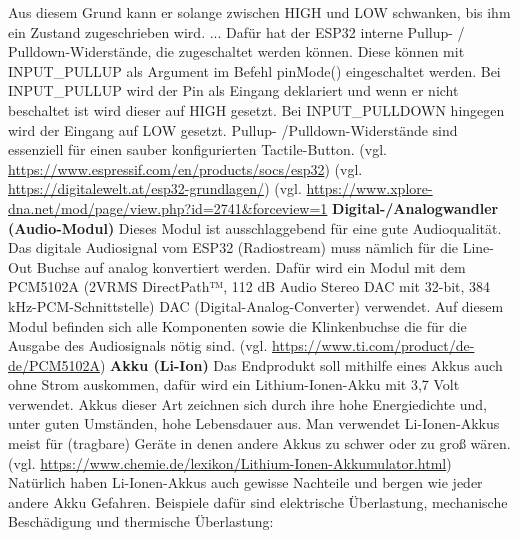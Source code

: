 \documentclass[11pt, twoside]{article}
\begin{document}
Aus diesem Grund kann er solange zwischen HIGH und LOW schwanken, bis ihm ein Zustand zugeschrieben wird. \grqq{} ... \glqq Dafür hat der ESP32 interne Pullup- / Pulldown-Widerstände, die zugeschaltet werden können. Diese können mit INPUT\_PULLUP als Argument im Befehl pinMode() eingeschaltet werden.
Bei INPUT\_PULLUP wird der Pin als Eingang deklariert und wenn er nicht beschaltet ist wird dieser auf HIGH gesetzt.
Bei INPUT\_PULLDOWN hingegen wird der Eingang auf LOW gesetzt.\grqq{} Pullup- /Pulldown-Widerstände sind essenziell für einen sauber konfigurierten Tactile-Button.
\vspace{4mm} \newline
(vgl. \url{https://www.espressif.com/en/products/socs/esp32}) \newline
(vgl. \url {https://digitalewelt.at/esp32-grundlagen/})\newline
(vgl. \url {https://www.xplore-dna.net/mod/page/view.php?id=2741&forceview=1}
\vspace{4mm}\newline
\textbf{Digital-/Analogwandler (Audio-Modul)}\newline
Dieses Modul ist ausschlaggebend für eine gute Audioqualität. Das digitale Audiosignal vom ESP32 (Radiostream) muss nämlich für die Line-Out Buchse auf analog konvertiert werden. Dafür wird ein Modul mit dem PCM5102A (\glqq 2VRMS DirectPath™, 112 dB Audio Stereo DAC mit 32-bit, 384 kHz-PCM-Schnittstelle\grqq{}) DAC (Digital-Analog-Converter) verwendet. Auf diesem Modul befinden sich alle Komponenten sowie die Klinkenbuchse die für die Ausgabe des Audiosignals nötig sind.
\vspace{4mm} \newline
(vgl. \url{https://www.ti.com/product/de-de/PCM5102A})
\vspace{4mm}\newline
\textbf{Akku (Li-Ion)}\newline
Das Endprodukt soll mithilfe eines Akkus auch ohne Strom auskommen, dafür wird ein Lithium-Ionen-Akku mit 3,7 Volt verwendet. Akkus dieser Art zeichnen sich durch ihre hohe Energiedichte und, unter guten Umständen, hohe Lebensdauer aus. Man verwendet Li-Ionen-Akkus meist für (tragbare) Geräte in denen andere Akkus zu schwer oder zu groß wären. (vgl. \url{https://www.chemie.de/lexikon/Lithium-Ionen-Akkumulator.html}) \vspace{4mm}\newline
Natürlich haben Li-Ionen-Akkus auch gewisse Nachteile und bergen wie jeder andere Akku Gefahren. Beispiele dafür sind elektrische Überlastung, mechanische Beschädigung und thermische Überlastung:
\end{document}
